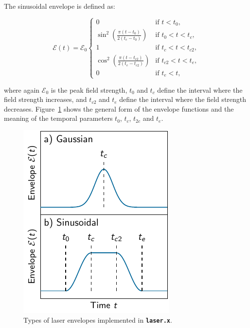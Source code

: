 \documentclass[a4paper,11pt,DIV=15,openany,twoside=false]{scrbook}
\newcommand{\tthdump}[1]{#1}
\newcommand{\ttt}[1]{\textbf{\texttt{#1}}}
\begin{document}
The sinusoidal envelope is defined as:
\tthdump{
  \begin{equation}
    \mathcal{E}(t)=\mathcal{E}_0
    \begin{cases}
      0                                                   &\text{if } t<t_0,\\
      \sin^2\left(\frac{\pi(t-t_0)}{2(t_c-t_0)}\right)      &\text{if } t_0<t<t_c,\\
      1                                                   &\text{if } t_c<t<t_{c2},\\
      \cos^2\left(\frac{\pi(t-t_{c2})}{2(t_e-t_{c2})}\right)      &\text{if } t_{c2}<t<t_e,\\
      0                                                   &\text{if } t_e<t,\label{eq:laser_sinus}
    \end{cases}
  \end{equation}
}
where again $\mathcal{E}_0$ is the peak field strength, $t_0$ and $t_c$ define the interval where the field strength increases, and $t_{c2}$ and $t_e$ define the interval where the field strength decreases. Figure~\ref{fig:laser_envelope} shows the general form of the envelope functions and the meaning of the temporal parameters $t_0$, $t_c$, $t_{2c}$ and $t_e$.

\begin{figure}[h!]
  \centering
  \includegraphics[scale=1]{img/laser_envelope/laser_envelope.pdf}
  \caption{Types of laser envelopes implemented in \ttt{laser.x}.}
  \label{fig:laser_envelope}
\end{figure}
\end{document}
